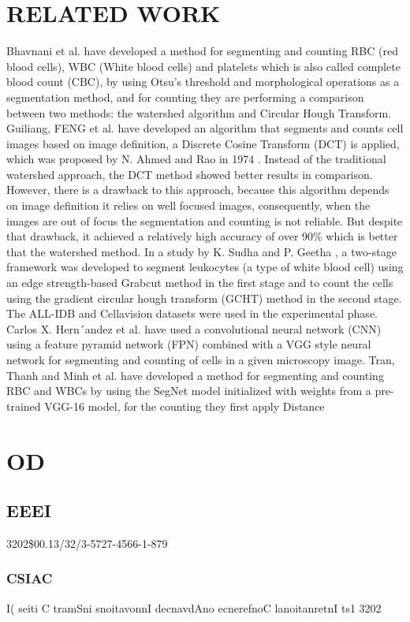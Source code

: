 \documentclass[conference]{IEEEtran}
\begin{document}
\section{RELATED WORK}
Bhavnani et al. \cite{ref2} have developed a method for segmenting and counting RBC (red blood cells), WBC (White blood cells) and platelets which is also called complete blood count (CBC), by using Otsu’s threshold and morphological operations as a segmentation method, and for counting they are performing a comparison between two methods: the watershed algorithm and Circular Hough Transform.
Guiliang, FENG et al. \cite{ref3} have developed an algorithm that segments and counts cell images based on image definition, a Discrete Cosine Transform (DCT) is applied, which was proposed by N. Ahmed and Rao in 1974 \cite{ref4}. Instead of the traditional watershed approach, the DCT method showed better results in comparison. However, there is a drawback to this approach, because this algorithm depends on image definition it relies on well focused images, consequently, when the images are out of focus the segmentation and counting is not reliable. But despite that drawback, it achieved a relatively high accuracy of over 90\% which is better that the watershed method. In a study by K. Sudha and P. Geetha \cite{ref5}, a two-stage framework was developed to segment leukocytes (a type of white blood cell) using an edge strength-based Grabcut method in the first stage and to count the cells using the gradient circular hough transform (GCHT) method in the second stage. The ALL-IDB \cite{ref6} and Cellavision \cite{ref7} datasets were used in the experimental phase.
Carlos X. Hern´andez et al. \cite{ref8} have used a convolutional neural network (CNN) using a feature pyramid network (FPN) combined with a VGG style neural network for segmenting and counting of cells in a given microscopy image.
Tran, Thanh and Minh et al. \cite{ref9} have developed a method for segmenting and counting RBC and WBCs by using the SegNet model initialized with weights from a pre-trained VGG-16 model, for the counting they first apply Distance

\section{OD} 
\subsection{EEEI} 
3202\$00.13/32/3-5727-4566-1-879 
\subsubsection{CSIAC} 
I( 
seiti 
C 
tramSni 
snoitavonnI 
decnavdAno 
ecnerefnoC 
lanoitanretnI 
ts1 
3202
\end{document}
